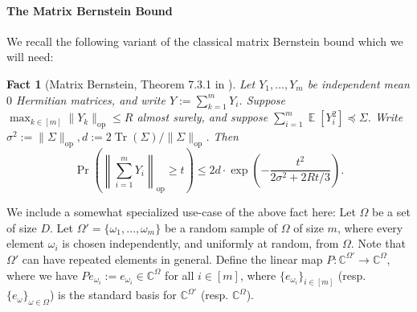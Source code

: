 \documentclass
[11pt,letterpaper]
{article}
\newtheorem{fact}[theorem]{Fact}
\theoremstyle{definition}
\newcommand{\Tr}{\operatorname{Tr}}
\newcommand{\1}{\mathbf{1}}
\newcommand{\C}{\mathbb C}
\DeclareMathOperator*{\E}{\mathbb{E}}
\renewcommand{\geq}{\geqslant}
\renewcommand{\leq}{\leqslant}
\renewcommand{\preceq}{\preccurlyeq}
\begin{document}
\paragraph{The Matrix Bernstein Bound} We recall the following variant of the classical matrix Bernstein bound which we will need:
\begin{fact}[Matrix Bernstein, Theorem 7.3.1 in \cite{Tro15}]\label{fact:matrix-Bernstein}
    Let $Y_1, \ldots, Y_m$ be independent mean $0$ Hermitian matrices, and write $Y:= \sum_{k = 1}^mY_i$. Suppose $\max_{k\in[m]}\|Y_k\|_{\operatorname{op}}\leq R$ almost surely, and suppose $\sum_{i = 1}^m\E[Y_i^2]\preceq \Sigma$. Write $\sigma^2:= \|\Sigma\|_{\operatorname{op}}, d:= 2\Tr(\Sigma)/\|\Sigma\|_{\operatorname{op}}$. Then
    \[\Pr\left(\left\|\sum_{i = 1}^mY_i\right\|_{\operatorname{op}}\geq t\right)\leq 2d\cdot\exp\left(-\frac{t^2}{2\sigma^2 + 2Rt/3}\right).\]
\end{fact}
We include a somewhat specialized use-case of the above fact here: Let $\Omega$ be a set of size $D$. Let $\Omega' = \{\omega_1, \ldots, \omega_m\}$ be a random sample of $\Omega$ of size $m$, where every element $\omega_i$ is chosen independently, and uniformly at random, from $\Omega$. Note that $\Omega'$ can have repeated elements in general. Define the linear map $P:\C^{\Omega'}\to\C^{\Omega}$, where we have $Pe_{\omega_i}:= e_{\omega_i}\in\C^\Omega$ for all $i\in[m]$, where $\{e_{\omega_i}\}_{i\in[m]}$ (resp. $\{e_\omega\}_{\omega\in\Omega}$) is the standard basis for $\C^{\Omega'}$ (resp. $\C^{\Omega}$).
\end{document}
